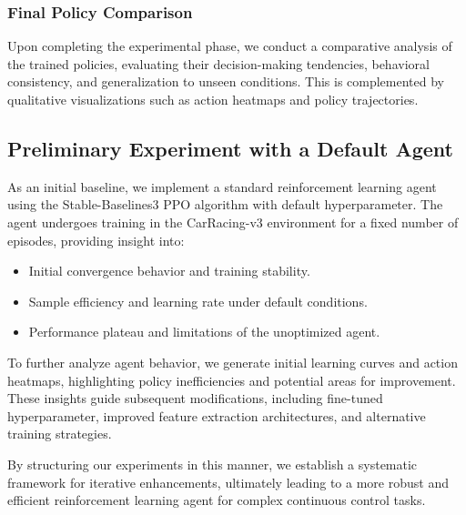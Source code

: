 \documentclass[../CSC_52081_EP.tex]{subfiles}
\begin{document}
\subsubsection{Final Policy Comparison}
Upon completing the experimental phase, we conduct a comparative analysis of the trained policies, evaluating their decision-making tendencies, behavioral consistency, and generalization to unseen conditions. This is complemented by qualitative visualizations such as action heatmaps and policy trajectories.

\subsection{Preliminary Experiment with a Default Agent}
As an initial baseline, we implement a standard reinforcement learning agent using the Stable-Baselines3 PPO algorithm with default hyperparameter. The agent undergoes training in the CarRacing-v3 environment for a fixed number of episodes, providing insight into:

\begin{itemize}
\item Initial convergence behavior and training stability.
\item Sample efficiency and learning rate under default conditions.
\item Performance plateau and limitations of the unoptimized agent.
\end{itemize}

To further analyze agent behavior, we generate initial learning curves and action heatmaps, highlighting policy inefficiencies and potential areas for improvement. These insights guide subsequent modifications, including fine-tuned hyperparameter, improved feature extraction architectures, and alternative training strategies.

By structuring our experiments in this manner, we establish a systematic framework for iterative enhancements, ultimately leading to a more robust and efficient reinforcement learning agent for complex continuous control tasks.
\end{document}
